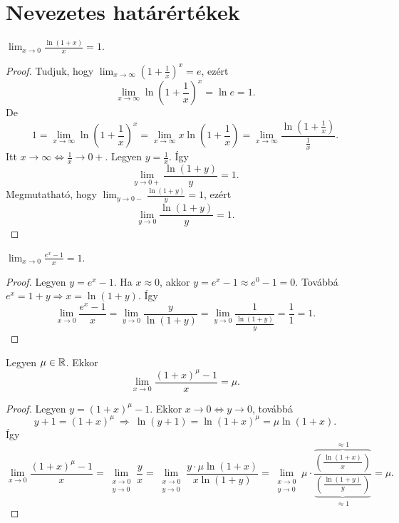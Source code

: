 \documentclass[11pt]{article}
\begin{document}
\section{Nevezetes határértékek}

\begin{thmbox}
\begin{theorem}
$\displaystyle\lim_{x\to 0}\frac{\ln(1+x)}{x}=1 .$
\end{theorem}
\end{thmbox}
\begin{proof}
Tudjuk, hogy $\displaystyle\lim_{x\to\infty}\left(1+\frac{1}{x}\right)^{x}=e$, ezért
\[
\lim_{x\to\infty}\ln\left(1+\frac{1}{x}\right)^{x}=\ln e=1 .
\]
De
\[
1=\lim_{x\to\infty}\ln\left(1+\frac{1}{x}\right)^{x}=\lim_{x\to\infty}x\ln\left(1+\frac{1}{x}\right)=\lim_{x\to\infty}\frac{\ln\left(1+\frac{1}{x}\right)}{\frac{1}{x}} .
\]
Itt $x\to\infty\iff\frac{1}{x}\to 0+$. Legyen $y=\frac{1}{x}$. Így
\[
\lim_{y\to 0+}\frac{\ln(1+y)}{y}=1 .
\]
Megmutatható, hogy $\displaystyle\lim_{y\to 0-}\frac{\ln(1+y)}{y}=1$, ezért
\[
\lim_{y\to 0}\frac{\ln(1+y)}{y}=1 .
\]
\end{proof}

\begin{thmbox}
\begin{theorem}
$\displaystyle\lim_{x\to 0}\frac{e^{x}-1}{x}=1 .$
\end{theorem}
\end{thmbox}
\begin{proof}
Legyen $y=e^{x}-1$. Ha $x\approx 0$, akkor $y=e^{x}-1\approx e^{0}-1=0$. Továbbá $e^{x}=1+y\Longrightarrow x=\ln(1+y)$. Így
\[
\lim_{x\to 0}\frac{e^{x}-1}{x}=\lim_{y\to 0}\frac{y}{\ln(1+y)}=\lim_{y\to 0}\frac{1}{\frac{\ln(1+y)}{y}}=\frac{1}{1}=1 .
\]
\end{proof}

\begin{thmbox}
\begin{theorem}
Legyen $\mu\in\mathbb{R}$. Ekkor
\[
\lim_{x\to 0}\frac{(1+x)^{\mu}-1}{x}=\mu .
\]
\end{theorem}
\end{thmbox}
\begin{proof}
Legyen $y=(1+x)^{\mu}-1$. Ekkor $x\to 0\iff y\to 0$, továbbá
\[
y+1=(1+x)^{\mu}\ \Longrightarrow\ \ln(y+1)=\ln(1+x)^{\mu}=\mu\ln(1+x).
\]
Így
\[
\lim_{x\to 0}\frac{(1+x)^{\mu}-1}{x}
=\lim_{\substack{x\to 0\\ y\to 0}}\frac{y}{x}
=\lim_{\substack{x\to 0\\ y\to 0}}\frac{y\cdot\mu\ln(1+x)}{x\ln(1+y)}
=\lim_{\substack{x\to 0\\ y\to 0}}\mu\cdot
\frac{\overset{\approx 1}{\overbrace{\left(\frac{\ln(1+x)}{x}\right)}}}{\underset{\approx 1}{\underbrace{\left(\frac{\ln(1+y)}{y}\right)}}}
=\mu .
\]
\end{proof}
\end{document}
